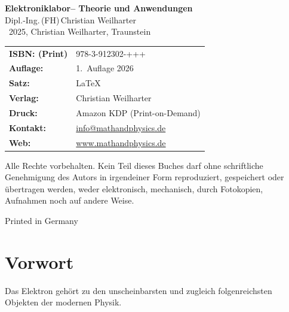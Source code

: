 \cleardoublepage
\thispagestyle{empty}
\begin{center}


{\Large\textbf{Elektroniklabor– Theorie und Anwendungen}}\\[1.2em]
{\large Dipl.-Ing.\,(FH)\,Christian Weilharter}\\[1.2em]
\textcopyright~2025, Christian Weilharter, Traunstein\\[2em]
\end{center}
\begin{flushleft}
	\begin{tabular}{@{}l l}
	
	
		\textbf{ISBN: (Print)} & 978-3-912302-+++\\[0.5em]
		\textbf{Auflage:} & 1.~Auflage 2026 \\[0.5em]
		\textbf{Satz:} & \LaTeX \\[0.5em]
		\textbf{Verlag:} & Christian Weilharter \\[0.5em]
		\textbf{Druck:} & Amazon KDP (Print-on-Demand) \\[0.5em]

		
		\textbf{Kontakt:} & \href{mailto:info@mathandphysics.de}{info@mathandphysics.de}\\[0.5em]
		\textbf{Web:} & \href{https://www.mathandphysics.de}{www.mathandphysics.de}\\
		

	\end{tabular}
\end{flushleft}

\vspace{2em}
\noindent
Alle Rechte vorbehalten. Kein Teil dieses Buches darf ohne schriftliche Genehmigung des Autors 
in irgendeiner Form reproduziert, gespeichert oder übertragen werden, 
weder elektronisch, mechanisch, durch Fotokopien, Aufnahmen noch auf andere Weise.
\begin{center}\small Printed in Germany\end{center}

\cleardoublepage
\chapter*{Vorwort}

Das Elektron gehört zu den unscheinbarsten und zugleich folgenreichsten Objekten der modernen Physik. 







